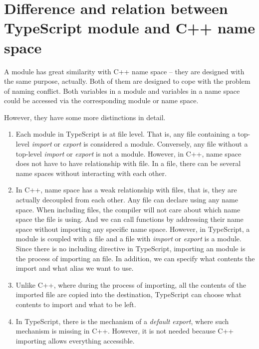 \documentclass[a4paper]{report}
\begin{document}
\section{Difference and relation between TypeScript module and C++ name space}
A module has great similarity with C++ name space -- they are designed with the same purpose, actually. Both of them are designed to cope with the problem of naming conflict. Both variables in a module and variables in a name space could be accessed via the corresponding module or name space. 
\par
However, they have some more distinctions in detail. 
\begin{enumerate}
\item Each module in TypeScript is at file level. That is, any file containing a top-level \emph{import} or \emph{export} is considered a module. Conversely, any file without a top-level \emph{import} or \emph{export} is not a module. However, in C++, name space does not have to have relationship with file. In a file, there can be several name spaces without interacting with each other. 
\item
In C++, name space has a weak relationship with files, that is, they are actually decoupled from each other. Any file can declare using any name space. When including files, the compiler will not care about which name space the file is using. And we can call functions by addressing their name space without importing any specific name space. However, in TypeScript, a  module is coupled with a file and a file with \emph{import} or \emph{export} is a module. Since there is no including directive in TypeScript, importing an module is the process of importing an file. In addition, we can specify what contents the import and what alias we want to use.
\item
Unlike C++, where during the process of importing, all the contents of the imported file are copied into the destination, TypeScript can choose what contents to import and what to be left.
\item
In TypeScript, there is the mechanism of a \emph{default export}, where such mechanism is missing in C++. However, it is not needed because C++ importing allows everything accessible.
\end{enumerate}
\par
\end{document}
